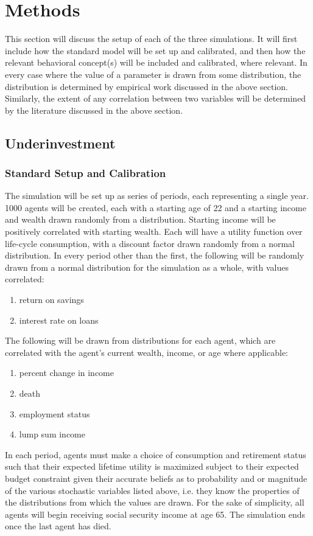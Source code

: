 \documentclass[10pt,twocolumn]{article}
\begin{document}
\section{Methods}
This section will discuss the setup of each of the three simulations. It will first include how the standard model will be set up and calibrated, and then how the relevant behavioral concept(s) will be included and calibrated, where relevant. In every case where the value of a parameter is drawn from some distribution, the distribution is determined by empirical work discussed in the above section. Similarly, the extent of any correlation between two variables will be determined by the literature discussed in the above section. 

\subsection{Underinvestment}
\subsubsection{Standard Setup and Calibration}
The simulation will be set up as series of periods, each representing a single year. 1000 agents will be created, each with a starting age of 22 and a starting income and wealth drawn randomly from a distribution. Starting income will be positively correlated with starting wealth. Each will have a utility function over life-cycle consumption, with a discount factor drawn randomly from a normal distribution. In every period other than the first, the following will be randomly drawn from a normal distribution for the simulation as a whole, with values correlated:
\begin{enumerate}
    \item return on savings
    \item interest rate on loans
\end{enumerate}
The following will be drawn from distributions for each agent, which are correlated with the agent’s current wealth, income, or age where applicable:
\begin{enumerate}
    \item percent change in income
    \item death
    \item employment status
    \item lump sum income
\end{enumerate}
\setenumerate
In each period, agents must make a choice of consumption and retirement status such that their expected lifetime utility is maximized subject to their expected budget constraint given their accurate beliefs as to probability and or magnitude of the various stochastic variables listed above, i.e. they know the properties of the distributions from which the values are drawn. For the sake of simplicity, all agents will begin receiving social security income at age 65. The simulation ends once the last agent has died.
\end{document}
